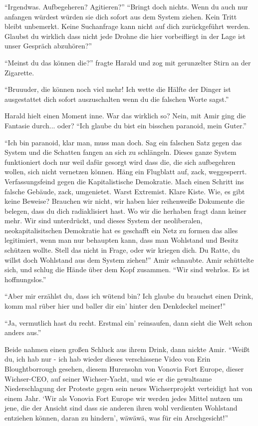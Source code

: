 ``Irgendwas. Aufbegeheren? Agitieren?''
``Bringt doch nichts. Wenn du auch nur anfangen würdest würden sie dich sofort aus dem System ziehen. Kein Tritt bleibt unbemerkt. Keine Suchanfrage kann nicht auf dich zurückgeführt werden. Glaubst du wirklich dass nicht jede Drohne die hier vorbeifliegt in der Lage ist unser Gespräch abzuhören?''

``Meinst du das können die?'' fragte Harald und zog mit gerunzelter Stirn an der Zigarette.

``Bruuuder, die können noch viel mehr! Ich wette die Hälfte der Dinger ist ausgestattet dich sofort auszuschalten wenn du die falschen Worte sagst.''

Harald hielt einen Moment inne. War das wirklich so? Nein, mit Amir ging die Fantasie durch... oder? 
``Ich glaube du bist ein bisschen paranoid, mein Guter.''

``Ich bin paranoid, klar man, muss man doch. Sag ein falschen Satz gegen das System und die Schatten fangen an sich zu schlängeln. Dieses ganze System funktioniert doch nur weil dafür gesorgt wird dass die, die sich aufbegehren wollen, sich nicht vernetzen können. Häng ein Flugblatt auf, zack, weggesperrt. Verfassungsfeind gegen die Kapitalistische Demokratie. Mach einen Schritt ins falsche Gebäude, zack, umgenietet. Warst Extremist. Klare Kiste. Wie, es gibt keine Beweise? Brauchen wir nicht, wir haben hier reihenweiße Dokumente die belegen, dass du dich radiaklisiert hast. Wo wir die herhaben fragt dann keiner mehr. Wir sind unterdrückt, und dieses System der neoliberalen, neokapitalisitschen Demokratie hat es geschafft ein Netz zu formen das alles legitimiert, wenn man nur behaupten kann, dass man Wohlstand und Besitz schützen wollte. Stell das nicht in Frage, oder wir kriegen dich. Du Ratte, du willst doch Wohlstand aus dem System ziehen!'' Amir schnaubte. Amir schüttelte sich, und schlug die Hände über dem Kopf zusammen. ``Wir sind wehrlos. Es ist hoffnungslos.''

``Aber mir erzählst du, dass ich wütend bin? Ich glaube du brauchst einen Drink, komm mal rüber hier und baller dir ein' hinter den Denkdeckel meiner!''

``Ja, vermutlich hast du recht. Erstmal ein' reinsaufen, dann sieht die Welt schon anders aus.''

Beide nahmen einen großen Schluck aus ihrem Drink, dann nickte Amir. ``Weißt du, ich hab nur - ich hab wieder dieses verschissene Video von Erin Bloughtborrough gesehen, diesem Hurensohn von Vonovia Fort Europe, dieser Wichser-CEO, auf seiner Wichser-Yacht, und wie er die gewaltsame Niederschlagung der Proteste gegen sein neues Wichserprojekt verteidigt hat von einem Jahr. `Wir als Vonovia Fort Europe wir werden jedes Mittel nutzen um jene, die der Ansicht sind dass sie anderen ihren wohl verdienten Wohlstand entziehen können, daran zu hindern', wäwäwä, was für ein Arschgesicht!''

